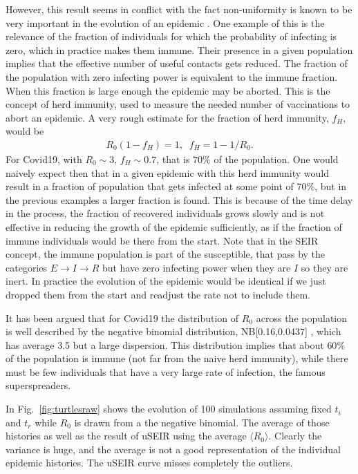 \documentclass[a4paper,oneside,11pt]{article}
\begin{document}
 However, this result seems in conflict with the fact non-uniformity is known to be very important in the evolution of an epidemic \cite{}. One example of this is the relevance of the fraction of individuals for which the probability of infecting is zero, which in practice makes them immune. Their presence in a given population implies that the effective number of useful contacts gets reduced. The fraction of the population with zero infecting power is equivalent to the immune fraction. When this fraction is large enough  the epidemic may be aborted. This is the concept of herd immunity, used to measure the needed number of vaccinations to abort an epidemic. A very rough estimate for the fraction of herd immunity, $f_H$, would be
   \begin{eqnarray}
  R_0 (1- f_H)  =1, \;\; f_H= 1-1/R_0.
   \end{eqnarray}
   For Covid19, with $R_0 \sim 3$, $f_H \sim 0.7$, that is $70\%$ of the population. One would naively expect then that in a given epidemic with this herd immunity would result in a fraction of  population that gets infected at some point of 70$\%$, but in the previous examples a larger fraction is found. This is because of the time delay in the process, the fraction of recovered individuals grows slowly and is not effective in reducing the growth of the epidemic sufficiently, as if the fraction of immune individuals would be there from the start. Note that in the SEIR concept, the immune population is part of the susceptible, that pass by the categories $E\rightarrow I \rightarrow R$ but have zero infecting power when they are $I$ so they are inert. In practice the evolution of the epidemic would be identical if we just dropped them from the start and readjust the rate not to include them. 
 
  It has been argued that for Covid19 the distribution of $R_0$ across the population is well described by the negative binomial distribution, NB[0.16,0.0437] \cite{LloydSmithNovember2020}, which has average 3.5 but a large dispersion. This distribution implies that about $60\%$ of the population is immune  (not far from the naive herd immunity), while there must be few individuals that have a very large rate of infection, the famous superspreaders.

  In Fig.~\ref{fig:turtlesraw} shows the evolution of 100 simulations assuming fixed $t_i$ and $t_r$ while $R_0$ is drawn from a the negative binomial. The average of those histories as well as the result of
  uSEIR using the average $\langle R_0\rangle$. Clearly the variance is huge, and the average is not a good representation of the individual epidemic histories. The uSEIR curve misses completely the outliers.
\end{document}
